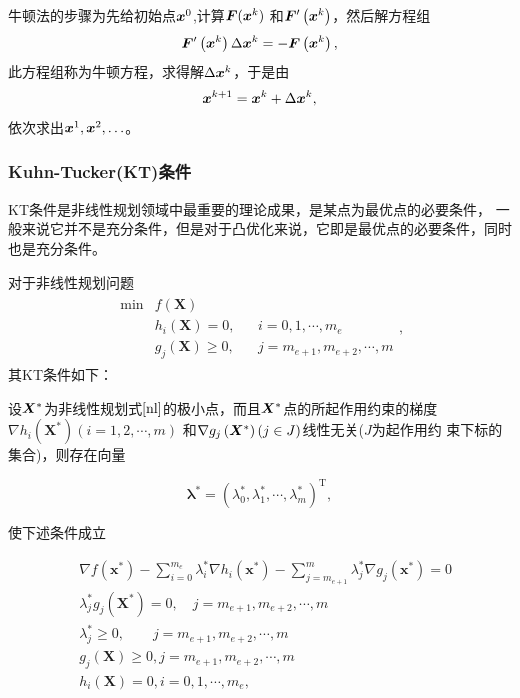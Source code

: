 \documentclass[12pt,oneside,a4paper]{article}
\begin{document}
牛顿法的步骤为先给初始点${\boldsymbol x}^0$,计算${\boldsymbol F}({\boldsymbol x}^k)$
和${\boldsymbol F}^{\prime}\left({\boldsymbol x}^{k}\right)$，然后解方程组
\begin{equation*}
{\boldsymbol F}^{\prime}\left({\boldsymbol x}^{k}\right) \Delta {\boldsymbol x}^{k}=-{\boldsymbol F}\left({\boldsymbol x}^{k}\right),
\end{equation*}
此方程组称为牛顿方程，求得解$\Delta {\boldsymbol x}^{k}$，于是由
\begin{equation*}
{\boldsymbol x}^{k+1}={\boldsymbol x}^{k}+\Delta {\boldsymbol x}^{k},
\end{equation*}
依次求出${\boldsymbol x}^1,{\boldsymbol x}^2,\ldots$。

\subsubsection{Kuhn-Tucker(KT)条件}
KT条件是非线性规划领域中最重要的理论成果\cite{yun}，是某点为最优点的必要条件，
一般来说它并不是充分条件，但是对于凸优化来说，它即是最优点的必要条件，同时也是充分条件。

对于非线性规划问题
\begin{align}\label{nl}
\begin{array}{rlrl}
\min & f(\mathbf{X}) & & \\
& h_{i}(\mathbf{X})=0, & & i=0,1, \cdots, m_e \\
& g_{j}(\mathbf{X}) \geqslant 0, & & j=m_{e+1},m_{e+2}, \cdots, m
\end{array},
\end{align}
\noindent 其KT条件如下：

设${\boldsymbol X}^*$为非线性规划式$\ref{nl}$的极小点，而且${\boldsymbol X}^*$点的所起作用约束的梯度
$\nabla h_{i}\left(\mathbf{X}^{*}\right)(i=1,2, \cdots, m)$
和$\nabla g_{j}\left({\boldsymbol X}^{*}\right)(j \in J)$线性无关($J$为起作用约
束下标的集合)，则存在向量

$$\boldsymbol{\lambda}^{*}=\left(\lambda_{0}^{*}, \lambda_{1}^{*}, \cdots, \lambda_{m}^{*}\right)^{\mathrm{T}},$$

\noindent 使下述条件成立

\begin{align*}
&\nabla f\left(\boldsymbol{x}^{*}\right)-\sum_{i=0}^{m_e} \lambda_{i}^{*} \nabla h_{i}\left(\boldsymbol{x}^{*}\right)-
\sum_{j=m_{e+1}}^{m} \lambda_{j}^{*} \nabla g_{j}\left(\boldsymbol{x}^{*}\right)=0 \\
&\lambda_{j}^{*} g_{j}\left(\boldsymbol{X}^{*}\right)=0, \quad j=m_{e+1},m_{e+2}, \cdots, m \\
&\lambda_{j}^{*} \geqslant 0, \quad \quad j = m_{e+1},m_{e+2}, \cdots, m\\
& g_{j}(\mathbf{X}) \geqslant 0,  j=m_{e+1},m_{e+2}, \cdots, m\\
& h_{i}(\mathbf{X})=0,  i=0,1, \cdots, m_e ,
\end{align*}
\end{document}
